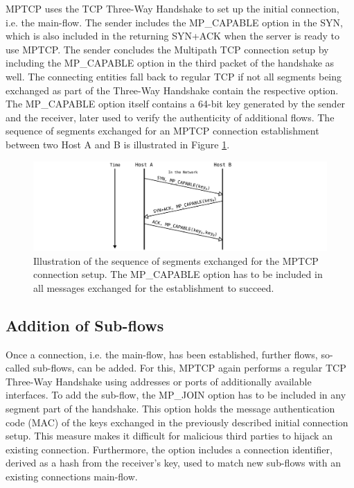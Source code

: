 MPTCP uses the TCP Three-Way Handshake to set up the initial connection, i.e. the main-flow. The sender includes the MP\_CAPABLE option in the SYN, which is also included in the returning SYN+ACK when the server is ready to use MPTCP. The sender concludes the Multipath TCP connection setup by including the MP\_CAPABLE option in the third packet of the handshake as well. The connecting entities fall back to regular TCP if not all segments being exchanged as part of the Three-Way Handshake contain the respective option. The MP\_CAPABLE option itself contains a 64-bit key generated by the sender and the receiver, later used to verify the authenticity of additional flows. The sequence of segments exchanged for an MPTCP connection establishment between two Host A and B is illustrated in Figure \ref{fig:MTCPConnectionEstablishment}.

\begin{figure}[H]
	\begin{center} 
		\def\svgwidth{1\textwidth}
		\includegraphics[scale=0.24]{../illustrations/importantConcepts/MPTCPHandshake.pdf} 
		\caption[]{Illustration of the sequence of segments exchanged for the MPTCP connection setup. The MP\_CAPABLE option has to be included in all messages exchanged for the establishment to succeed.}
		\label{fig:MTCPConnectionEstablishment}
	\end{center}
\end{figure}

\subsection*{Addition of Sub-flows}

Once a connection, i.e. the main-flow, has been established, further flows, so-called sub-flows, can be added. For this, MPTCP again performs a regular TCP Three-Way Handshake using addresses or ports of additionally available interfaces. To add the sub-flow, the MP\_JOIN option has to be included in any segment part of the handshake. This option holds the message authentication code (MAC) of the keys exchanged in the previously described initial connection setup. This measure makes it difficult for malicious third parties to hijack an existing connection. Furthermore, the option includes a connection identifier, derived as a hash from the receiver's key, used to match new sub-flows with an existing connections main-flow. 

